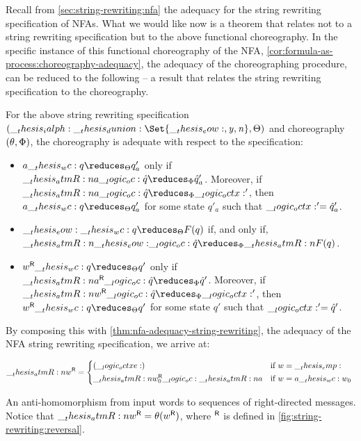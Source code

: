 Recall from \cref{sec:string-rewriting:nfa} the adequacy  for the string rewriting specification of \acp{NFA}.
%
\nfaadequacystringrewriting*
%
What we would like now is a theorem that relates  not to a string rewriting specification but to the above functional choreography.
In the specific instance of this functional choreography of the \ac{NFA}, \cref{cor:formula-as-process:choreography-adequacy}, the adequacy of the choreographing procedure, can be reduced to the following  -- a result that relates the string rewriting specification to the choreography.
\begin{corollary}\label{cor:chor-nfa-adequacy}
  For the above string rewriting specification $(\ialph \dunion \Set{\eow, \symacc, \symrej}, \srsig)$ and choreography $(\theta, \Phi)$, the choreography is adequate with respect to the specification:
  \begin{itemize}[nosep]
  \item
    $a \wc q \reduces_{\srsig} q'_a$ only if $\atmR{a} \oc \defp{q} \reduces_{\orsig} \defp{q}'_a$.
    Moreover, if $\atmR{a} \oc \defp{q} \reduces_{\orsig} \octx'$, then $a \wc q \reduces_{\srsig} q'_a$ for some state $q'_a$ such that $\__logic_octx:' = \hat{q}'_a$.
  \item
    $\eow \wc q \reduces_{\srsig} F(q)$ if, and only if, $\atmR{\eow} \oc \defp{q} \reduces_{\orsig} \atmR{F}(q)$.
  \item
    $\rev{w} \wc q \reduces_{\srsig} q'$ only if $\rev{\atmR{a}} \oc \defp{q} \reduces_{\orsig} \defp{q}'$.
    Moreover, if $\rev{\atmR{w}} \oc \defp{q} \reduces_{\orsig} \octx'$, then $\rev{w} \wc q \reduces_{\srsig} q'$ for some state $q'$ such that $\__logic_octx:' = \hat{q}'$.
  \end{itemize}
\end{corollary}
%
\noindent By composing this with \cref{thm:nfa-adequacy-string-rewriting}, the adequacy of the \ac{NFA} string rewriting specification, we arrive at:
%
\begin{marginfigure}
  \begin{equation*}
    \rev{\atmR{w}} =
      \begin{cases*}
        (\octxe) & if $w = \emp$ \\
        \rev{\atmR{w}_0} \oc \atmR{a} & if $w = a \wc w_0$
      \end{cases*}
  \end{equation*}
  \caption{An anti-homomorphism from input words to sequences of right-directed messages.
    Notice that $\rev{\atmR{w}} = \theta(\rev{w})$, where $\rev{}$ is defined in \cref{fig:string-rewriting:reversal}.}\label{fig:formula-as-process:msg-rev}
\end{marginfigure}%
